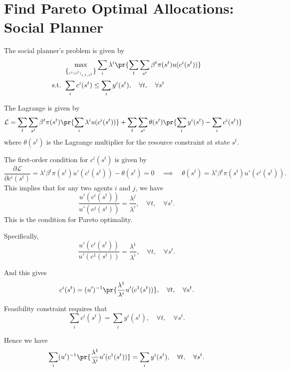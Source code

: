 

\section{Find Pareto Optimal Allocations: Social Planner}

The social planner's problem is given by
\[
\begin{aligned}
    & \max_{\brace{c^i(s^t)}_{i,t,s^t}}\sum_i \lambda^i \pr{\sum_t\sum_{s^t}\beta^t\pi(s^t)u(c^i(s^t))}\\
    \text{s.t. }& \sum_{i}c^i(s^t)\le \sum_i y^i(s^t),\quad \forall t,\quad \forall s^t
\end{aligned}
\]

The Lagrange is given by
\[
\begin{aligned}
    \mathcal{L} & = \sum_t\sum_{s^t}\beta^t\pi(s^t)\pr{\sum_i \lambda^i u(c^i(s^t))}+\sum_t\sum_{s^t}\theta(s^t)\pr{\sum_i y^i(s^t) - \sum_i c^i(s^t)}
\end{aligned}
\]
where $\theta(s^t)$ is the Lagrange multiplier for the resource constraint at state $s^t$.  

The first-order condition for $c^i(s^t)$ is given by
\[
\frac{\partial \mathcal{L}}{\partial c^i(s^t)} = \lambda^i \beta^t \pi(s^t) u'(c^i(s^t)) - \theta(s^t) = 0 \quad \implies \quad \theta(s^t) = \lambda^i \beta^t \pi(s^t) u'(c^i(s^t)).
\]
This implies that for any two agents $i$ and $j$, we have
\[
\frac{u'(c^i(s^t))}{u'(c^j(s^t))} = \frac{\lambda^j}{\lambda^i}, \quad \forall t, \quad \forall s^t.
\]
This is the condition for Pareto optimality.

Specifically, 
\[
\frac{u'(c^i(s^t))}{u'(c^1(s^t))} = \frac{\lambda^1}{\lambda^i}, \quad \forall t, \quad \forall s^t.
\]

And this gives
\[
c^i(s^t) = (u')^{-1}\pr{\frac{\lambda^1}{\lambda^i}u'(c^1(s^t))}, \quad \forall t, \quad \forall s^t.
\]

Feasibility constraint requires that
\[
\sum_i c^i(s^t) = \sum_i y^i(s^t), \quad \forall t, \quad \forall s^t.
\]

Hence we have
\[
\sum_i (u')^{-1}\pr{\frac{\lambda^1}{\lambda^i}u'(c^1(s^t))} = \sum_i y^i(s^t), \quad \forall t, \quad \forall s^t.
\]

